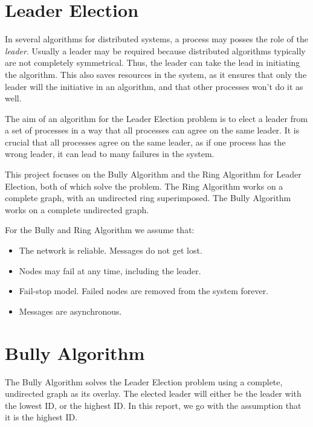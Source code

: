 \documentclass{report}
\begin{document}
\section{Leader Election}

In several algorithms for distributed systems, a process may posses the role of the \textit{leader}. Usually a leader may be required because distributed algorithms typically are not completely symmetrical. Thus, the leader can take the lead in initiating the algorithm. This also saves resources in the system, as it ensures that only the leader will the initiative in an algorithm, and that other processes won't do it as well.
\cite{kshemkalyani2011distributed}

The aim of an algorithm for the Leader Election problem is to elect a leader from a set of processes in a way that all processes can agree on the same leader. It is crucial that all processes agree on the same leader, as if one process has the wrong leader, it can lead to many failures in the system.


This project focuses on the Bully Algorithm and the Ring Algorithm for Leader Election, both of which solve the problem. The Ring Algorithm works on a complete graph, with an undirected ring superimposed. The Bully Algorithm works on a complete undirected graph.

For the Bully and Ring Algorithm we assume that:
\begin{itemize}
  \item The network is reliable. Messages do not get lost.
  \item Nodes may fail at any time, including the leader.
  \item Fail-stop model. Failed nodes are removed from the system forever.
  \item Messages are asynchronous.
\end{itemize}


\section{Bully Algorithm}

The Bully Algorithm solves the Leader Election problem using a complete, undirected graph as its overlay. The elected leader will either be the leader with the lowest ID, or the highest ID. In this report, we go with the assumption that it is the highest ID.
\end{document}
